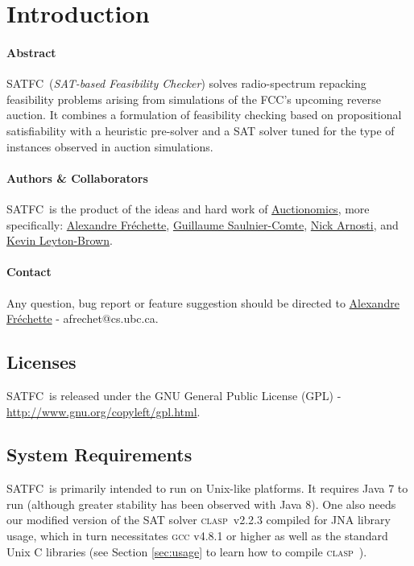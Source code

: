 \documentclass[
10pt, %
a4paper, %
oneside, %
headinclude,footinclude, %
BCOR5mm, %
]{scrartcl}
\newcommand{\SATFC}{\textsc{SATFC}~}
\newcommand{\clasp}{\textsc{clasp}~}
\begin{document}
\section{Introduction}

\paragraph{Abstract} \SATFC (\emph{SAT-based Feasibility Checker}) solves radio-spectrum repacking feasibility problems arising from simulations of the FCC's upcoming reverse auction. It combines a formulation of feasibility checking based on propositional satisfiability with a heuristic pre-solver and a SAT solver tuned for the type of instances observed in auction simulations.

\paragraph{Authors \& Collaborators}  \SATFC is the product of the ideas and hard work of \href{http://www.auctionomics.com/}{Auctionomics}, more specifically: \href{http://www.cs.ubc.ca/~afrechet/}{Alexandre Fr\'echette}, \href{http://www.cs.mcgill.ca/~gsauln/}{Guillaume Saulnier-Comte}, \href{http://web.stanford.edu/~narnosti/}{Nick Arnosti}, and \href{http://www.cs.ubc.ca/~kevinlb/}{Kevin Leyton-Brown}.

\paragraph{Contact} Any question, bug report or feature suggestion should be directed to \href{mailto:afrechet@cs.ubc.ca}{Alexandre Fr\'echette} - afrechet@cs.ubc.ca.

\subsection{Licenses}

\SATFC is released under the GNU General Public License (GPL) - \url{http://www.gnu.org/copyleft/gpl.html}.

\subsection{System Requirements}

\SATFC is primarily intended to run on Unix-like platforms. It requires Java 7 to run (although greater stability has been observed with Java 8). One also needs our modified version of the SAT solver \clasp v2.2.3 compiled for JNA library usage, which in turn necessitates \textsc{gcc} v4.8.1 or higher as well as the standard Unix C libraries (see Section \ref{sec:usage} to learn how to compile \clasp).
\end{document}
